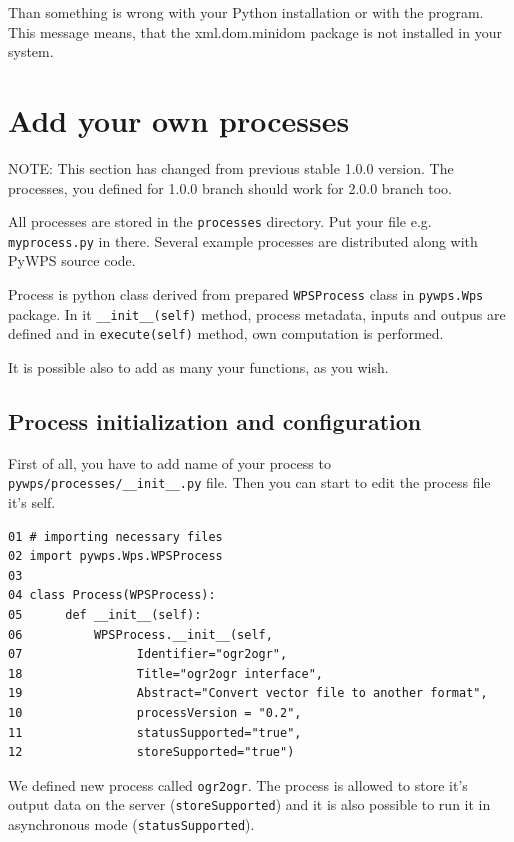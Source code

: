 \documentclass[a4paper,11pt]{article}
\newcommand{\note}[1]{\medskip{}\noindent{}NOTE: #1\medskip{}}
\begin{document}
     
Than something is wrong with your Python installation or with the program.
This message means, that the xml.dom.minidom package is not installed in
your system.
     


    
\section{Add your own processes}
\label{processes}
\note{This section has changed from previous stable 1.0.0 version. The
processes, you defined for 1.0.0 branch should work for 2.0.0 branch too.}
    
All processes are stored in the \texttt{processes} directory. Put your file
e.g. \texttt{myprocess.py} in there. Several example processes are
distributed along with PyWPS source code.
    
Process is python class derived from prepared \texttt{WPSProcess} class in
\texttt{pywps.Wps} package. In it \texttt{\_\_init\_\_(self)} method,
process metadata, inputs and outpus are defined and in
\texttt{execute(self)} method, own computation is performed.


It is possible also to add as many your functions, as you wish.
    
\subsection{Process initialization and configuration}
First of all, you have to add name of your process to
\texttt{pywps/processes/\_\_init\_\_.py} file. Then you can start to edit
the process file it's self.

\begin{verbatim}
01 # importing necessary files
02 import pywps.Wps.WPSProcess
03 
04 class Process(WPSProcess):
05      def __init__(self):
06          WPSProcess.__init__(self,
07                Identifier="ogr2ogr",
18                Title="ogr2ogr interface",
19                Abstract="Convert vector file to another format",
10                processVersion = "0.2",
11                statusSupported="true",
12                storeSupported="true")
\end{verbatim}

We defined new process called \texttt{ogr2ogr}. The process is allowed to
store it's output data on the server (\texttt{storeSupported}) and it is also possible to run it in
asynchronous mode (\texttt{statusSupported}).
     
\end{document}
